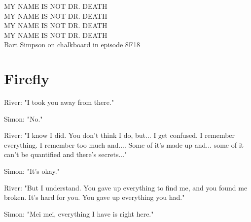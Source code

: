 \setcounter{equation}{0}  

MY NAME IS NOT DR. DEATH\\
MY NAME IS NOT DR. DEATH\\
MY NAME IS NOT DR. DEATH\\
MY NAME IS NOT DR. DEATH\\

	Bart Simpson on chalkboard in episode 8F18

\section{Firefly}
River: "I took you away from there."

Simon: "No."

River: "I know I did. You don't think I do, but... I get confused. I remember
everything. I remember too much and.... Some of it's made up and... some of
it can't be quantified and there's secrets..."

Simon: "It's okay."

River: "But I understand. You gave up everything to find me, and you found me
broken. It's hard for you. You gave up everything you had."

Simon: "Mei mei, everything I have is right here."